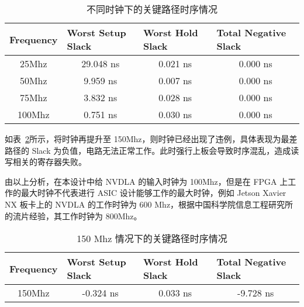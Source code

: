 \begin{table}[!htbp]
    \caption{不同时钟下的关键路径时序情况}
    \label{tab:25-100 Mhz Timing}
    \centering
    \footnotesize%
    \setlength{\tabcolsep}{4pt}%
    \renewcommand{\arraystretch}{1.2}%
    \begin{tabular}{cccc}
        \toprule
        \multicolumn{1}{l}{\textbf{Frequency}} & \multicolumn{1}{l}{\textbf{Worst Setup Slack}} & \multicolumn{1}{l}{\textbf{Worst Hold Slack}} & \multicolumn{1}{l}{\textbf{Total Negative Slack}} \\
        \midrule
        25Mhz                                  & 29.048 ns                                      & 0.021 ns                                      & 0.000 ns                                          \\
        50Mhz                                  & 9.959 ns                                       & 0.007 ns                                      & 0.000 ns                                          \\
        75Mhz                                  & 3.832 ns                                       & 0.028 ns                                      & 0.000 ns                                          \\
        100Mhz                                 & 0.751 ns                                       & 0.030 ns                                      & 0.000 ns                                          \\
        \bottomrule                   
    \end{tabular}
\end{table}

如表~\ref{tab:150 Mhz Timing}所示，将时钟再提升至 150Mhz，则时钟已经出现了违例，具体表现为最差路径的 Slack 为负值，电路无法正常工作。此时强行上板会导致时序混乱，造成读写相关的寄存器失败。

由以上分析，在本设计中给 NVDLA 的输入时钟为 100Mhz，但是在 FPGA 上工作的最大时钟不代表进行 ASIC 设计能够工作的最大时钟，例如 Jetson Xavier NX 板卡上的 NVDLA 的工作时钟为 600 Mhz，根据中国科学院信息工程研究所的流片经验，其工作时钟为 800Mhz。

\begin{table}[!htbp]
    \caption{150 Mhz 情况下的关键路径时序情况}
    \label{tab:150 Mhz Timing}
    \centering
    \footnotesize%
    \setlength{\tabcolsep}{4pt}%
    \renewcommand{\arraystretch}{1.2}%
    \begin{tabular}{llll}
        \toprule
        \textbf{Frequency}         & \textbf{Worst Setup Slack}    & \textbf{Worst Hold Slack}    & \textbf{Total Negative Slack} \\
        \midrule
        \multicolumn{1}{c}{150Mhz} & \multicolumn{1}{c}{-0.324 ns} & \multicolumn{1}{c}{0.033 ns} & \multicolumn{1}{c}{-9.728 ns} \\
        \bottomrule                   
    \end{tabular}
\end{table}

